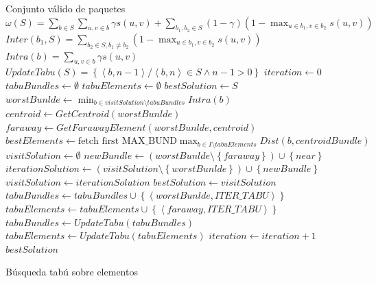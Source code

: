 \begin{algorithm}[H]
\begin{algorithmic}[1]
\ENSURE Conjunto válido de paquetes
\STATE $\omega(S) = \sum_{b \in S}{\sum_{u,v \in b}{\gamma s(u,v)}} + \sum_{b_1,b_2 \in S}{(1-\gamma) (1-\max_{u \in b_1, v \in b_2}{s(u,v)})}$
\STATE $Inter(b_1, S) = \sum_{b_2 \in S, b_1\neq b_2}{(1-\max_{u \in b_1, v \in b_2}{s(u,v)})}$
\STATE $Intra(b) = \sum_{u,v \in b}{\gamma s(u,v)}$
\STATE $UpdateTabu(S) = \left\{ \left\langle b, n-1 \right\rangle  / \left\langle b, n \right\rangle \in S \wedge n-1 > 0 \right\}$
\STATE $iteration \leftarrow 0$
\STATE $tabuBundles \leftarrow \emptyset$
\STATE $tabuElements \leftarrow \emptyset$
\STATE $bestSolution \leftarrow S$
  \STATE $worstBunlde \leftarrow \min_{b \in visitSolution \setminus tabuBundles}{Intra(b)}$
  \STATE $centroid \leftarrow GetCentroid(worstBunlde)$
  \STATE $faraway \leftarrow GetFarawayElement(worstBunlde,centroid)$
  \STATE $bestElements \leftarrow \text{fetch first MAX\_BUND} \max_{b \in I \setminus tabuElements}{Dist(b, centroidBundle)}$
	\STATE $visitSolution \leftarrow \emptyset$
		\STATE $newBundle \leftarrow (worstBunlde \setminus \left\{faraway\right\})\cup\left\{near\right\}$
		\STATE $iterationSolution \leftarrow (visitSolution \setminus \left\{worstBunlde\right\}) \cup \left\{newBundle\right\}$
			\STATE $visitSolution \leftarrow iterationSolution$
		\ENDIF
  \ENDFOR
		\STATE $bestSolution \leftarrow visitSolution$
  \ENDIF
	\STATE $tabuBundles \leftarrow tabuBundles \cup \left\{
	\left\langle worstBunlde, ITER\_TABU \right\rangle\right\}$
  \STATE $tabuElements \leftarrow tabuElements \cup \left\{
	\left\langle faraway, ITER\_TABU \right\rangle\right\}$
	\STATE $tabuBundles \leftarrow UpdateTabu(tabuBundles)$
  \STATE $tabuElements \leftarrow UpdateTabu(tabuElements)$
	\STATE $iteration \leftarrow iteration + 1$
\ENDWHILE
\RETURN $bestSolution$
\end{algorithmic}
\caption{Búsqueda tabú sobre elementos}\label{alg:algBusTabuIntra}
\end{algorithm}
